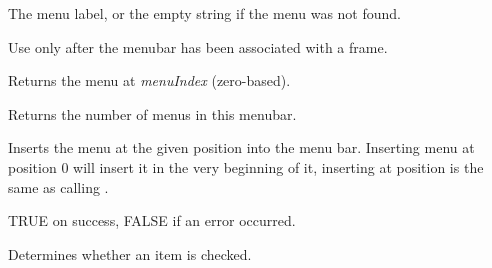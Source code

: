 
The menu label, or the empty string if the menu was not found.


Use only after the menubar has been associated with a frame.



\label{wxmenubargetmenu}


Returns the menu at {\it menuIndex} (zero-based).

\label{wxmenubargetmenucount}


Returns the number of menus in this menubar.

\label{wxmenubarinsert}


Inserts the menu at the given position into the menu bar. Inserting menu at
position $0$ will insert it in the very beginning of it, inserting at position 
 is the same as calling 
.






TRUE on success, FALSE if an error occurred.



\label{wxmenubarischecked}


Determines whether an item is checked.



